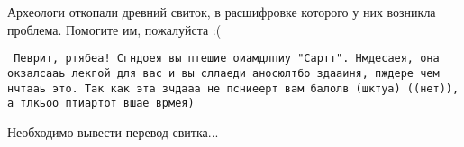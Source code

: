 Археологи откопали древний свиток, в расшифровке которого у них возникла проблема.
Помогите им, пожалуйста :(

\texttt{
Певрит, ртябеа!
Сгндоея вы птешие оиамдлпиу "Сартт".
Нмдесаея, она окзалсааь лекгой для вас и вы сллаеди аносюлтбо здааиня, пждере чем нчтааь это.
Так как эта зчдааа не псниеерт вам балолв (шктуа) ((нет)), а тлкьоо птиартот вшае врмея)
}


\OutputFile

Необходимо вывести перевод свитка...

\SAMPLES